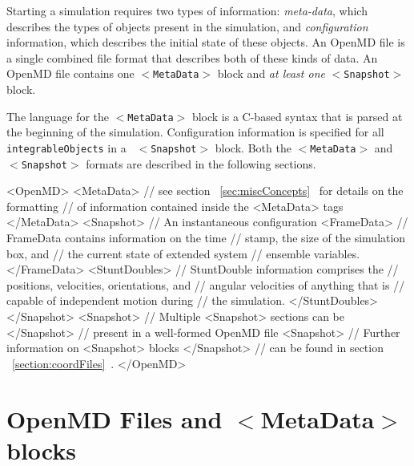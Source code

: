 \documentclass[]{book}
\begin{document}
Starting a simulation requires two types of information: {\it
meta-data}, which describes the types of objects present in the
simulation, and {\it configuration} information, which describes the
initial state of these objects.  An {\sc OpenMD} file is a single
combined file format that describes both of these kinds of data.  An
{\sc OpenMD} file contains one {\tt $<$MetaData$>$} block and {\it at least
one} {\tt $<$Snapshot$>$} block.

The language for the {\tt $<$MetaData$>$} block is a C-based syntax that
is parsed at the beginning of the simulation.  Configuration
information is specified for all {\tt integrableObjects} in a {\tt
$<$Snapshot$>$} block.  Both the {\tt $<$MetaData$>$} and {\tt $<$Snapshot$>$}
formats are described in the following sections.

\begin{code}[caption={[The structure of an {\sc OpenMD} file]
The basic structure of an {\sc OpenMD} file contains HTML-like tags to
define simulation meta-data and subsequent instantaneous configuration
information. A well-formed {\sc OpenMD} file must contain one {\tt <MetaData>}
block and {\it at least one} {\tt <Snapshot>} block.  Each
{\tt <Snapshot>} is further divided into {\tt <FrameData>} and 
 {\tt <StuntDoubles>} sections.},label={sch:mdFormat}]
<OpenMD>
  <MetaData>
      // see section ~\ref{sec:miscConcepts}~ for details on the formatting
      // of information contained inside the <MetaData> tags
  </MetaData>
  <Snapshot>         // An instantaneous configuration
     <FrameData>
                     // FrameData contains information on the time
                     // stamp, the size of the simulation box, and 
                     // the current state of extended system 
                     // ensemble variables.
     </FrameData>
     <StuntDoubles>
                     // StuntDouble information comprises the 
                     // positions, velocities, orientations, and 
                     // angular velocities of anything that is 
                     // capable of independent motion during 
                     // the simulation.
     </StuntDoubles>
  </Snapshot>       
  <Snapshot>         // Multiple <Snapshot> sections can be
  </Snapshot>        // present in a well-formed OpenMD file
  <Snapshot>         // Further information on <Snapshot> blocks
  </Snapshot>        // can be found in section ~\ref{section:coordFiles}~.
</OpenMD>
\end{code}


\section{OpenMD Files and $<$MetaData$>$ blocks}
\end{document}
